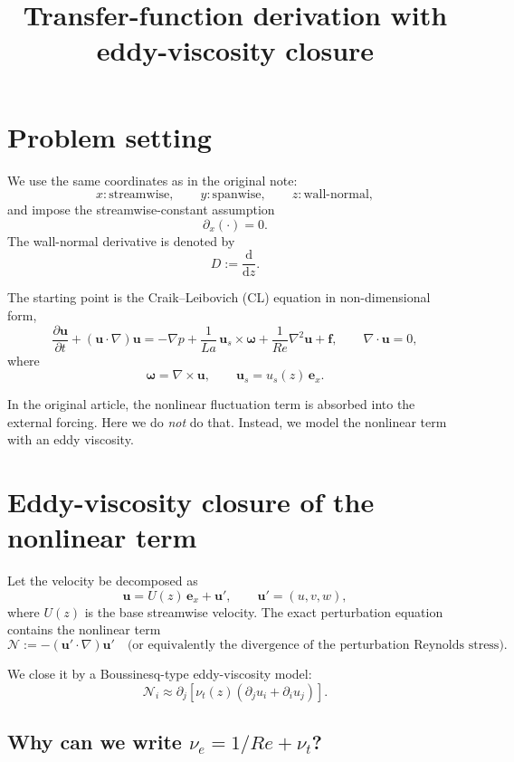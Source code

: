 \documentclass[11pt]{article}
\title{Transfer-function derivation with eddy-viscosity closure}
\author{}
\date{}
\begin{document}
\maketitle

\section{Problem setting}

We use the same coordinates as in the original note:
\[
x:\text{streamwise}, \qquad y:\text{spanwise}, \qquad z:\text{wall-normal},
\]
and impose the streamwise-constant assumption
\[
\partial_x(\cdot)=0.
\]
The wall-normal derivative is denoted by
\[
D := \frac{\mathrm d}{\mathrm d z}.
\]

The starting point is the Craik--Leibovich (CL) equation in non-dimensional form,
\begin{equation}
\frac{\partial \bm u}{\partial t}
+(\bm u\cdot\nabla)\bm u
=-\nabla p
+\frac{1}{La}\,\bm u_s\times \bm\omega
+\frac{1}{Re}\nabla^2\bm u
+\bm f,
\qquad
\nabla\cdot\bm u=0,
\label{eq:cl-original}
\end{equation}
where
\[
\bm\omega=\nabla\times\bm u,
\qquad
\bm u_s=u_s(z)\,\bm e_x.
\]

In the original article, the nonlinear fluctuation term is absorbed into the external forcing. Here we do \emph{not} do that. Instead, we model the nonlinear term with an eddy viscosity.

\section{Eddy-viscosity closure of the nonlinear term}

Let the velocity be decomposed as
\[
\bm u = U(z)\,\bm e_x + \bm u',
\qquad
\bm u' = (u,v,w),
\]
where \(U(z)\) is the base streamwise velocity. The exact perturbation equation contains the nonlinear term
\[
\bm{\mathcal N}
:=
-(\bm u'\cdot\nabla)\bm u'
\quad
\text{(or equivalently the divergence of the perturbation Reynolds stress).}
\]

We close it by a Boussinesq-type eddy-viscosity model:
\begin{equation}
\mathcal N_i
\approx
\partial_j\!\left[
\nu_t(z)\left(
\partial_j u_i + \partial_i u_j
\right)
\right].
\label{eq:boussinesq-closure}
\end{equation}

\subsection{Why can we write $\nu_e=1/Re+\nu_t$?}
\end{document}
